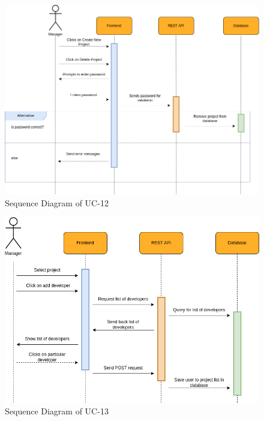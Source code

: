 \begin{figure}[H]
    \centering
    \includegraphics[scale=0.5]{./diagrams/sequence/seq-12.png}
    \caption{Sequence Diagram of UC-12}
    \label{fig:seq-12}
    
\end{figure}


\begin{figure}[H]
    \centering
    \includegraphics[scale=0.5]{./diagrams/sequence/seq-13.png}
    \caption{Sequence Diagram of UC-13}
    \label{fig:seq-13}
    
\end{figure}



